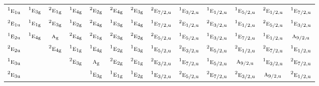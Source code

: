 \documentclass[10pt,a4paper]{article}
\numberwithin{equation}{section}
\newcommand{\irr}[1]{\text{\normalfont\scshape #1}}
\newcommand{\conjpair}[1]{{}^{#1}}
\newcommand{\ptag}[1]{\mathrm{#1}}
\begin{document}
{\begin{longtable}{@{}lcccccccccccc@{}}
$\conjpair{1}\irr{e}_{1\ptag{u}}$ & $\conjpair{1}\irr{e}_{3\ptag{g}}$ & $\conjpair{2}\irr{e}_{1\ptag{g}}$ & $\conjpair{1}\irr{e}_{4\ptag{g}}$ & $\conjpair{2}\irr{e}_{2\ptag{g}}$ & $\conjpair{2}\irr{e}_{4\ptag{g}}$ & $\conjpair{2}\irr{e}_{3\ptag{g}}$ & $\conjpair{2}\irr{e}_{7/2,\ptag{u}}$ & $\conjpair{1}\irr{e}_{3/2,\ptag{u}}$ & $\conjpair{1}\irr{e}_{1/2,\ptag{u}}$ & $\conjpair{1}\irr{e}_{5/2,\ptag{u}}$ & $\conjpair{2}\irr{e}_{1/2,\ptag{u}}$ & $\conjpair{1}\irr{e}_{7/2,\ptag{u}}$\\
$\conjpair{2}\irr{e}_{1\ptag{u}}$ & $\conjpair{1}\irr{e}_{1\ptag{g}}$ & $\conjpair{2}\irr{e}_{3\ptag{g}}$ & $\conjpair{1}\irr{e}_{2\ptag{g}}$ & $\conjpair{2}\irr{e}_{4\ptag{g}}$ & $\conjpair{1}\irr{e}_{3\ptag{g}}$ & $\conjpair{1}\irr{e}_{4\ptag{g}}$ & $\conjpair{1}\irr{e}_{7/2,\ptag{u}}$ & $\conjpair{2}\irr{e}_{1/2,\ptag{u}}$ & $\conjpair{2}\irr{e}_{3/2,\ptag{u}}$ & $\conjpair{1}\irr{e}_{1/2,\ptag{u}}$ & $\conjpair{2}\irr{e}_{5/2,\ptag{u}}$ & $\conjpair{1}\irr{e}_{3/2,\ptag{u}}$\\
$\conjpair{1}\irr{e}_{2\ptag{u}}$ & $\conjpair{1}\irr{e}_{4\ptag{g}}$ & $\irr{a}_{\ptag{g}}$ & $\conjpair{2}\irr{e}_{4\ptag{g}}$ & $\conjpair{2}\irr{e}_{1\ptag{g}}$ & $\conjpair{2}\irr{e}_{3\ptag{g}}$ & $\conjpair{2}\irr{e}_{2\ptag{g}}$ & $\conjpair{2}\irr{e}_{5/2,\ptag{u}}$ & $\conjpair{1}\irr{e}_{5/2,\ptag{u}}$ & $\conjpair{1}\irr{e}_{3/2,\ptag{u}}$ & $\conjpair{1}\irr{e}_{7/2,\ptag{u}}$ & $\conjpair{1}\irr{e}_{1/2,\ptag{u}}$ & $\irr{a}_{9/2,\ptag{u}}$\\
$\conjpair{2}\irr{e}_{2\ptag{u}}$ &  & $\conjpair{2}\irr{e}_{4\ptag{g}}$ & $\conjpair{1}\irr{e}_{1\ptag{g}}$ & $\conjpair{1}\irr{e}_{4\ptag{g}}$ & $\conjpair{1}\irr{e}_{2\ptag{g}}$ & $\conjpair{1}\irr{e}_{3\ptag{g}}$ & $\conjpair{1}\irr{e}_{5/2,\ptag{u}}$ & $\conjpair{2}\irr{e}_{3/2,\ptag{u}}$ & $\conjpair{2}\irr{e}_{5/2,\ptag{u}}$ & $\conjpair{2}\irr{e}_{1/2,\ptag{u}}$ & $\conjpair{2}\irr{e}_{7/2,\ptag{u}}$ & $\conjpair{1}\irr{e}_{1/2,\ptag{u}}$\\
$\conjpair{1}\irr{e}_{3\ptag{u}}$ &  &  & $\conjpair{2}\irr{e}_{3\ptag{g}}$ & $\irr{a}_{\ptag{g}}$ & $\conjpair{2}\irr{e}_{2\ptag{g}}$ & $\conjpair{2}\irr{e}_{1\ptag{g}}$ & $\conjpair{2}\irr{e}_{3/2,\ptag{u}}$ & $\conjpair{1}\irr{e}_{7/2,\ptag{u}}$ & $\conjpair{1}\irr{e}_{5/2,\ptag{u}}$ & $\irr{a}_{9/2,\ptag{u}}$ & $\conjpair{1}\irr{e}_{3/2,\ptag{u}}$ & $\conjpair{2}\irr{e}_{7/2,\ptag{u}}$\\
$\conjpair{2}\irr{e}_{3\ptag{u}}$ &  &  &  & $\conjpair{1}\irr{e}_{3\ptag{g}}$ & $\conjpair{1}\irr{e}_{1\ptag{g}}$ & $\conjpair{1}\irr{e}_{2\ptag{g}}$ & $\conjpair{1}\irr{e}_{3/2,\ptag{u}}$ & $\conjpair{2}\irr{e}_{5/2,\ptag{u}}$ & $\conjpair{2}\irr{e}_{7/2,\ptag{u}}$ & $\conjpair{2}\irr{e}_{3/2,\ptag{u}}$ & $\irr{a}_{9/2,\ptag{u}}$ & $\conjpair{2}\irr{e}_{1/2,\ptag{u}}$\\

\end{longtable}}
\end{document}
